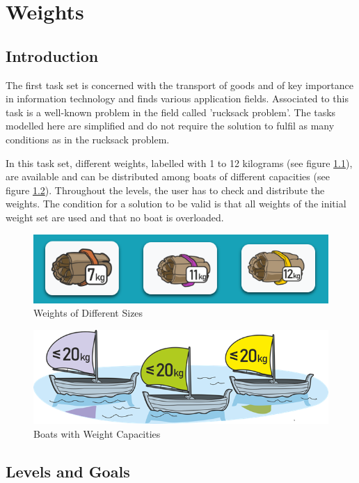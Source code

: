 \chapter{Weights}
\label{chapter:weights}

\section{Introduction}
\label{section:introduction}
The first task set is concerned with the transport of goods and of key importance in information technology and finds various application fields. Associated to this task is a well-known problem in the field called 'rucksack problem'. The tasks modelled here are simplified and do not require the solution to fulfil as many conditions as in the rucksack problem. 

In this task set, different weights, labelled with 1 to 12 kilograms (see figure \ref{fig:weights}), are available and can be distributed among boats of different capacities (see figure \ref{fig:boats}). Throughout the levels, the user has to check and distribute the weights. The condition for a solution to be valid is that all weights of the initial weight set are used and that no boat is overloaded.


\begin{figure}[H]
    \centering
    \includegraphics[width=0.6 \columnwidth]{figures/weights.png}
    \caption{Weights of Different Sizes} 
    \label{fig:weights} 
\end{figure}

\begin{figure}[H]
    \centering
    \includegraphics[width=0.6 \columnwidth]{figures/boats.png}
    \caption{Boats with Weight Capacities} 
    \label{fig:boats} 
\end{figure}

\section{Levels and Goals}
\label{section:assignment}

